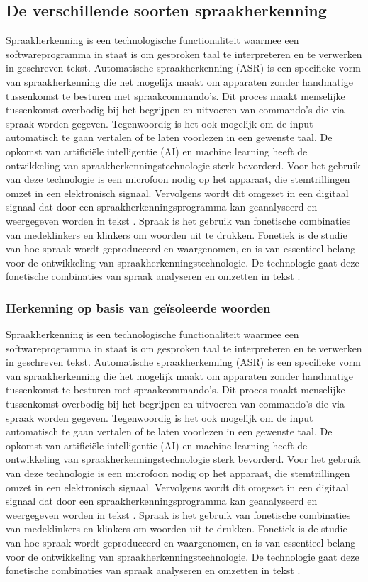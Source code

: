 \subsection{De verschillende soorten spraakherkenning}
Spraakherkenning is een technologische functionaliteit waarmee een softwareprogramma in staat is om gesproken taal te interpreteren en te verwerken in geschreven tekst. \autocite{Anusuya2009} Automatische spraakherkenning (ASR) is een specifieke vorm van spraakherkenning die het mogelijk maakt om apparaten zonder handmatige tussenkomst te besturen met spraakcommando's. Dit proces maakt menselijke tussenkomst overbodig bij het begrijpen en uitvoeren van commando's die via spraak worden gegeven. Tegenwoordig is het ook mogelijk om de input automatisch te gaan vertalen of te laten voorlezen in een gewenste taal. De opkomst van artificiële intelligentie (AI) en machine learning heeft de ontwikkeling van spraakherkenningstechnologie sterk bevorderd. Voor het gebruik van deze technologie is een microfoon nodig op het apparaat, die stemtrillingen omzet in een elektronisch signaal. Vervolgens wordt dit omgezet in een digitaal signaal dat door een spraakherkenningsprogramma kan geanalyseerd en weergegeven worden in tekst \autocite{Zwass2022}. Spraak is het gebruik van fonetische combinaties van medeklinkers en klinkers om woorden uit te drukken. Fonetiek is de studie van hoe spraak wordt geproduceerd en waargenomen, en is van essentieel belang voor de ontwikkeling van spraakherkenningstechnologie. De technologie gaat deze fonetische combinaties van spraak analyseren en omzetten in tekst \autocite{Mehrish2023}.

\subsubsection{Herkenning op basis van geïsoleerde woorden}
Spraakherkenning is een technologische functionaliteit waarmee een softwareprogramma in staat is om gesproken taal te interpreteren en te verwerken in geschreven tekst. \autocite{Anusuya2009} Automatische spraakherkenning (ASR) is een specifieke vorm van spraakherkenning die het mogelijk maakt om apparaten zonder handmatige tussenkomst te besturen met spraakcommando's. Dit proces maakt menselijke tussenkomst overbodig bij het begrijpen en uitvoeren van commando's die via spraak worden gegeven. Tegenwoordig is het ook mogelijk om de input automatisch te gaan vertalen of te laten voorlezen in een gewenste taal. De opkomst van artificiële intelligentie (AI) en machine learning heeft de ontwikkeling van spraakherkenningstechnologie sterk bevorderd. Voor het gebruik van deze technologie is een microfoon nodig op het apparaat, die stemtrillingen omzet in een elektronisch signaal. Vervolgens wordt dit omgezet in een digitaal signaal dat door een spraakherkenningsprogramma kan geanalyseerd en weergegeven worden in tekst \autocite{Zwass2022}. Spraak is het gebruik van fonetische combinaties van medeklinkers en klinkers om woorden uit te drukken. Fonetiek is de studie van hoe spraak wordt geproduceerd en waargenomen, en is van essentieel belang voor de ontwikkeling van spraakherkenningstechnologie. De technologie gaat deze fonetische combinaties van spraak analyseren en omzetten in tekst \autocite{Mehrish2023}.

